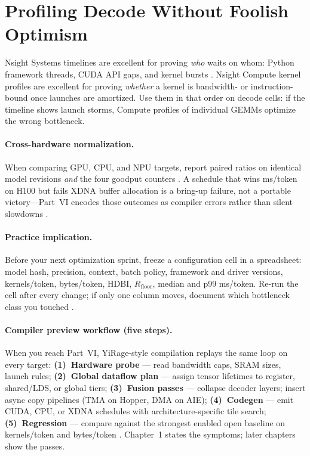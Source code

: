 \section{Profiling Decode Without Foolish Optimism}
\label{sec:profiling_discipline}

Nsight Systems timelines are excellent for proving \emph{who} waits on whom: Python framework threads, CUDA API gaps, and kernel bursts \citep{nvidia2024cudagraphs}.
Nsight Compute kernel profiles are excellent for proving \emph{whether} a kernel is bandwidth- or instruction-bound once launches are amortized.
Use them in that order on decode cells: if the timeline shows launch storms, Compute profiles of individual GEMMs optimize the wrong bottleneck.

\paragraph{Cross-hardware normalization.}
When comparing GPU, CPU, and NPU targets, report paired ratios on identical model revisions \emph{and} the four goodput counters \citep{memoryfloor2026,amd2024xdna,yirage2026}.
A schedule that wins ms/token on H100 but fails XDNA buffer allocation is a bring-up failure, not a portable victory---Part~VI encodes those outcomes as compiler errors rather than silent slowdowns \citep{yirage2026}.

\paragraph{Practice implication.}
Before your next optimization sprint, freeze a configuration cell in a spreadsheet: model hash, precision, context, batch policy, framework and driver versions, kernels/token, bytes/token, HDBI, $R_{\mathrm{floor}}$, median and p99 ms/token.
Re-run the cell after every change; if only one column moves, document which bottleneck class you touched \citep{taxbreak2026,memoryfloor2026}.


\paragraph{Compiler preview workflow (five steps).}
When you reach Part~VI, YiRage-style compilation replays the same loop on every target:
\textbf{(1)~Hardware probe} --- read bandwidth caps, SRAM sizes, launch rules;
\textbf{(2)~Global dataflow plan} --- assign tensor lifetimes to register, shared/LDS, or global tiers;
\textbf{(3)~Fusion passes} --- collapse decoder layers; insert async copy pipelines (TMA on Hopper, DMA on AIE);
\textbf{(4)~Codegen} --- emit CUDA, CPU, or XDNA schedules with architecture-specific tile search;
\textbf{(5)~Regression} --- compare against the strongest enabled open baseline on kernels/token and bytes/token \citep{yirage2026,chen2020compilerbasedhardw}.
Chapter~1 states the symptoms; later chapters show the passes.

